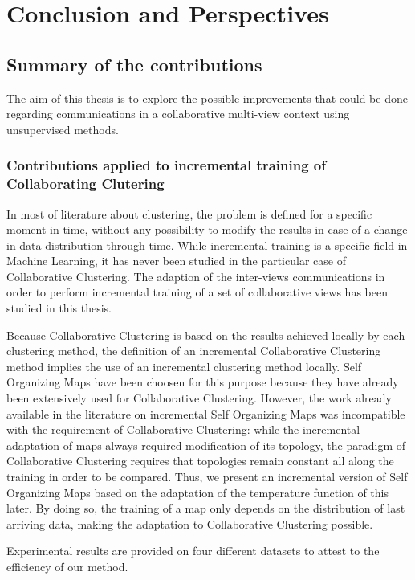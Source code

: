 \chapter{Conclusion and Perspectives}

\minitoc{}
\newpage

\section{Summary of the contributions}
The aim of this thesis is to explore the possible improvements that could be done regarding communications in a collaborative multi-view context using unsupervised methods.

\subsection{Contributions applied to incremental training of Collaborating Clutering}

In most of literature about clustering, the problem is defined for a specific moment in time, without any possibility to modify the results in case of a change in data distribution through time. While incremental training is a specific field in Machine Learning, it has never been studied in the particular case of Collaborative Clustering. The adaption of the inter-views communications in order to perform incremental training of a set of collaborative views has been studied in this thesis.

Because Collaborative Clustering is based on the results achieved locally by each clustering method, the definition of an incremental Collaborative Clustering method implies the use of an incremental clustering method locally. Self Organizing Maps have been choosen for this purpose because they have already been extensively used for Collaborative Clustering. However, the work already available in the literature on incremental Self Organizing Maps was incompatible with the requirement of Collaborative Clustering: while the incremental adaptation of maps always required modification of its topology, the paradigm of Collaborative Clustering requires that topologies remain constant all along the training in order to be compared. Thus, we present an incremental version of Self Organizing Maps based on the adaptation of the temperature function of this later. By doing so, the training of a map only depends on the distribution of last arriving data, making the adaptation to Collaborative Clustering possible.

Experimental results are provided on four different datasets to attest to the efficiency of our method.

